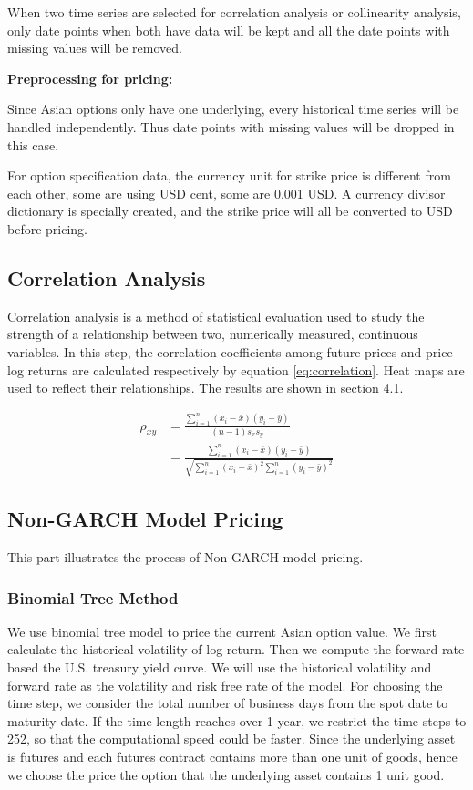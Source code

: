 \documentclass[10pt, a4paper, twocolumn]{article} %
\begin{document}
When two time series are selected for correlation analysis or collinearity analysis, only date points when both have data will be kept and all the date points with missing values will be removed.

\textbf {Preprocessing for pricing:}

Since Asian options only have one underlying, every historical time series will be handled independently. Thus date points with missing values will be dropped in this case.

For option specification data, the currency unit for strike price is different from each other, some are using USD cent, some are 0.001 USD. A currency divisor dictionary is specially created, and the strike price will all be converted to USD before pricing.

\subsection{Correlation Analysis}

Correlation analysis is a method of statistical evaluation used to study the strength of a relationship between two, numerically measured, continuous variables. In this step, the correlation coefficients among future prices and price log returns are calculated respectively by equation \ref{eq:correlation}. Heat maps are used to reflect their relationships. The results are shown in section 4.1.

\begin{equation} \label{eq:correlation}
\begin{aligned}
\rho_{xy} &= \frac {\sum_{i=1}^n (x_i-\bar x)(y_i-\bar y)}{(n-1)s_xs_y}
\\
&=\frac {\sum_{i=1}^n (x_i-\bar x)(y_i-\bar y)}{\sqrt{\sum_{i=1}^n(x_i - \bar x)^2 \sum_{i=1}^n(y_i - \bar y)^2}}
\end{aligned}
\end{equation}

\subsection{Non-GARCH Model Pricing}

This part illustrates the process of Non-GARCH model pricing.

\subsubsection{Binomial Tree Method}

We use binomial tree model to price the current Asian option value. We first calculate the historical volatility of log return. Then we compute the forward rate based the U.S. treasury yield curve. We will use the historical volatility and forward rate as the volatility and risk free rate of the model. For choosing the time step, we consider the total number of business days from the spot date to maturity date. If the time length reaches over 1 year, we restrict the time steps to 252, so that the computational speed could be faster. Since the underlying asset is futures and each futures contract contains more than one unit of goods, hence we choose the price the option that the underlying asset contains 1 unit good.
\end{document}
